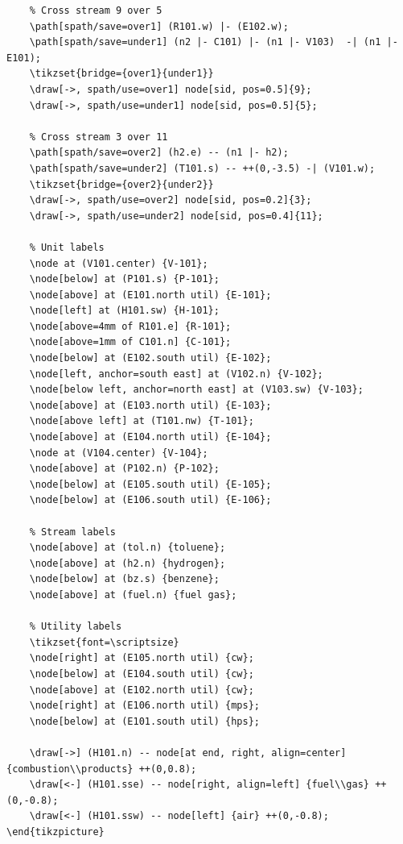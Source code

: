 \documentclass[11pt]{article}
\begin{document}
\begin{lstlisting}
	% Cross stream 9 over 5
	\path[spath/save=over1] (R101.w) |- (E102.w);
	\path[spath/save=under1] (n2 |- C101) |- (n1 |- V103)  -| (n1 |- E101);
	\tikzset{bridge={over1}{under1}}	
	\draw[->, spath/use=over1] node[sid, pos=0.5]{9};
	\draw[->, spath/use=under1] node[sid, pos=0.5]{5};	
	
	% Cross stream 3 over 11
	\path[spath/save=over2] (h2.e) -- (n1 |- h2);
	\path[spath/save=under2] (T101.s) -- ++(0,-3.5) -| (V101.w);
	\tikzset{bridge={over2}{under2}}
	\draw[->, spath/use=over2] node[sid, pos=0.2]{3};
	\draw[->, spath/use=under2] node[sid, pos=0.4]{11};
	
	% Unit labels
	\node at (V101.center) {V-101};
	\node[below] at (P101.s) {P-101};
	\node[above] at (E101.north util) {E-101};
	\node[left] at (H101.sw) {H-101};
	\node[above=4mm of R101.e] {R-101};
	\node[above=1mm of C101.n] {C-101};
	\node[below] at (E102.south util) {E-102};
	\node[left, anchor=south east] at (V102.n) {V-102};
	\node[below left, anchor=north east] at (V103.sw) {V-103};
	\node[above] at (E103.north util) {E-103};
	\node[above left] at (T101.nw) {T-101};
	\node[above] at (E104.north util) {E-104};
	\node at (V104.center) {V-104};
	\node[above] at (P102.n) {P-102};
	\node[below] at (E105.south util) {E-105};
	\node[below] at (E106.south util) {E-106};
	
	% Stream labels
	\node[above] at (tol.n) {toluene};
	\node[above] at (h2.n) {hydrogen};
	\node[below] at (bz.s) {benzene};
	\node[above] at (fuel.n) {fuel gas};
	
	% Utility labels
	\tikzset{font=\scriptsize}
	\node[right] at (E105.north util) {cw};
	\node[below] at (E104.south util) {cw};
	\node[above] at (E102.north util) {cw};
	\node[right] at (E106.north util) {mps};
	\node[below] at (E101.south util) {hps};
	
	\draw[->] (H101.n) -- node[at end, right, align=center] {combustion\\products} ++(0,0.8);
	\draw[<-] (H101.sse) -- node[right, align=left] {fuel\\gas} ++(0,-0.8);
	\draw[<-] (H101.ssw) -- node[left] {air} ++(0,-0.8);	
\end{tikzpicture}	
\end{lstlisting}


\end{document}
